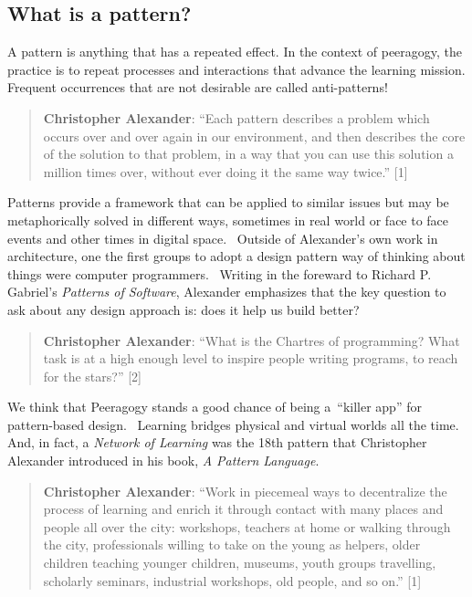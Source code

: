 \subsection{What is a pattern?}

A pattern is anything that has a repeated effect. In the context of
peeragogy, the practice is to repeat processes and interactions that
advance the learning mission. Frequent occurrences that are not
desirable are called anti-patterns!

\begin{quote}
\textbf{Christopher Alexander}: ``Each pattern describes a problem which
occurs over and over again in our environment, and then describes the
core of the solution to that problem, in a way that you can use this
solution a million times over, without ever doing it the same way
twice.'' {[}1{]}
\end{quote}

Patterns provide a framework that can be applied to similar issues but
may be metaphorically solved in different ways, sometimes in real world
or face to face events and other times in digital space.~ Outside of
Alexander's own work in architecture, one the first groups to adopt a
design pattern way of thinking about things were computer programmers.~
Writing in the foreward to Richard P. Gabriel's \emph{Patterns of
Software}, Alexander emphasizes that the key question to ask about any
design approach is: does it help us build better?

\begin{quote}
\textbf{Christopher Alexander}: ``What is the Chartres of programming?
What task is at a high enough level to inspire people writing programs,
to reach for the stars?'' {[}2{]}
\end{quote}

We think that Peeragogy stands a good chance of being a~``killer app''
for pattern-based design.~ Learning bridges physical and virtual worlds
all the time.~ And, in fact, a \emph{Network of Learning} was the 18th
pattern that Christopher Alexander introduced in his book, \emph{A
Pattern Language}.

\begin{quote}
\textbf{Christopher Alexander}: ``Work in piecemeal ways to decentralize
the process of learning and enrich it through contact with many places
and people all over the city: workshops, teachers at home or walking
through the city, professionals willing to take on the young as helpers,
older children teaching younger children, museums, youth groups
travelling, scholarly seminars, industrial workshops, old people, and so
on.'' {[}1{]}
\end{quote}

